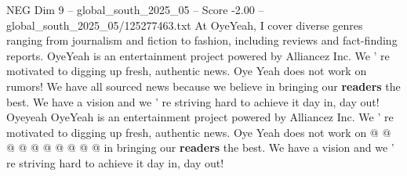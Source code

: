 \begin{textsample}{NEG Dim 9 – global\_south\_2025\_05 – Score -2.00 – global\_south\_2025\_05/125277463.txt}
At OyeYeah, I cover diverse genres ranging from journalism and fiction to fashion, including reviews and fact-finding reports.
OyeYeah is an entertainment project powered by Alliancez Inc.
We ' re motivated to digging up fresh, authentic news.
Oye Yeah does not work on rumors!
We have all sourced news because we believe in bringing our \textbf{readers} the best.
We have a vision and we ' re striving hard to achieve it day in, day out!
Oyeyeah OyeYeah is an entertainment project powered by Alliancez Inc.
We ' re motivated to digging up fresh, authentic news.
Oye Yeah does not work on @ @ @ @ @ @ @ @ @ @ in bringing our \textbf{readers} the best.
We have a vision and we ' re striving hard to achieve it day in, day out!

\end{textsample}
